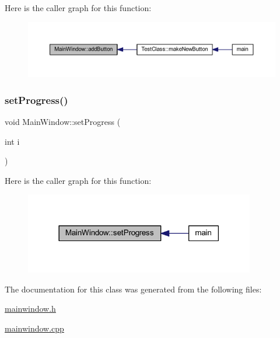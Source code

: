 Here is the caller graph for this function\+:
\nopagebreak
\begin{figure}[H]
\begin{center}
\leavevmode
\includegraphics[width=350pt]{class_main_window_a962b966d1e81982b7b9da86f0df0bbc1_icgraph}
\end{center}
\end{figure}
\mbox{\label{class_main_window_ae576381be77310817278e79c978d1135}} 
\subsubsection{\texorpdfstring{set\+Progress()}{setProgress()}}
{\footnotesize\ttfamily void Main\+Window\+::set\+Progress (\begin{DoxyParamCaption}\item[{int}]{i }\end{DoxyParamCaption})}

Here is the caller graph for this function\+:
\nopagebreak
\begin{figure}[H]
\begin{center}
\leavevmode
\includegraphics[width=285pt]{class_main_window_ae576381be77310817278e79c978d1135_icgraph}
\end{center}
\end{figure}


The documentation for this class was generated from the following files\+:\begin{DoxyCompactItemize}
\item 
\mbox{\hyperlink{mainwindow_8h}{mainwindow.\+h}}\item 
\mbox{\hyperlink{mainwindow_8cpp}{mainwindow.\+cpp}}\end{DoxyCompactItemize}
